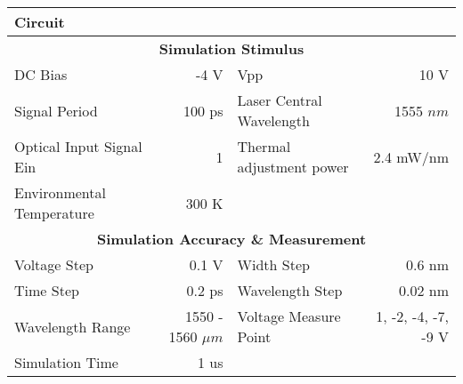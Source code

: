\documentclass[\projectroot/template.tex]{subfiles}
\begin{document}
\begin{table}[!h]
\begin{tabular}{l @{\hskip-20pt}r @{\hskip10pt}l @{\hskip-30pt}r}
		\textbf{Circuit}                    &                               &                                     &                               \\ \toprule
		\multicolumn{4}{c}{\textbf{Simulation Stimulus}}                                              \\
		DC Bias                             & -4 V                          & Vpp                                 & 10 V                          \\
		Signal Period                       & 100 ps                        & Laser Central Wavelength            & 1555 $nm$                     \\
		Optical Input Signal Ein            & 1                             & Thermal adjustment power            & 2.4 mW/nm                     \\
		Environmental Temperature           & 300 K                         &                                     &                               \\
		\multicolumn{4}{c}{\textbf{Simulation Accuracy \& Measurement}}                                      \\
		Voltage Step                        & 0.1 V                         & Width Step                          & 0.6 nm                        \\
		Time Step                           & 0.2 ps                        & Wavelength Step                     & 0.02 nm                       \\
		Wavelength Range                    & 1550 - 1560 $\mu m$           & Voltage Measure Point               & 1, -2, -4, -7, -9 V           \\
		Simulation Time                     & 1 us                          &                                     &                               \\ \bottomrule
	\end{tabular}
\end{table}
\end{document}
